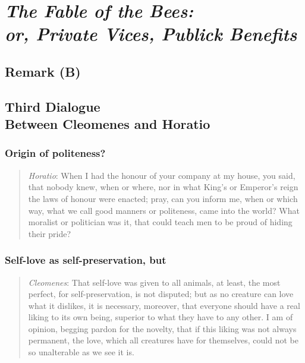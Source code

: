 \section[\textit{The Fable of the Bees}]{\textit{The Fable of the Bees:} \\ \textit{or, Private Vices, Publick Benefits}}

    \subsection{Remark (B)}

    \subsection{Third Dialogue \\ Between Cleomenes and Horatio}

        \subsubsection{Origin of politeness?}

            \begin{quote}
                \textit{Horatio}: When I had the honour of your company at my house, you said, that nobody knew, when or where, nor in what King’s or Emperor’s reign the laws of honour were enacted; pray, can you inform me, when or which way, what we call good manners or politeness, came into the world? What moralist or politician was it, that could teach men to be proud of hiding their pride?
            \end{quote}

        \subsubsection{Self-love as self-preservation, but}

            \begin{quote}
                \textit{Cleomenes}: That self-love was given to all animals, at least, the most perfect, for self-preservation, is not disputed; but as no creature can love what it dislikes, it is necessary, moreover, that everyone should have a real liking to its own being, superior to what they have to any other. I am of opinion, begging pardon for the novelty, that if this liking was not always permanent, the love, which all creatures have for themselves, could not be so unalterable as we see it is.
            \end{quote}

